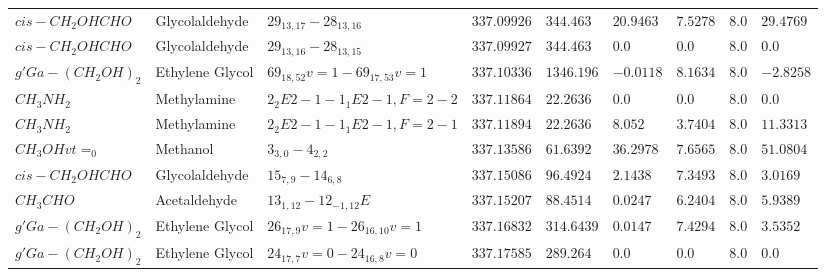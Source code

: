 \documentclass{aa}
\begin{document}
\begin{table}
\begin{tabular}{l l l l l l l l l}
$cis-CH_{2}OHCHO$ & Glycolaldehyde & $29_{13,17}-28_{13,16}$ & $337.09926$ & $344.463$ & $20.9463$ & $7.5278$ & $8.0$ & $29.4769$\\
$cis-CH_{2}OHCHO$ & Glycolaldehyde & $29_{13,16}-28_{13,15}$ & $337.09927$ & $344.463$ & $0.0$ & $0.0$ & $8.0$ & $0.0$\\
$g'Ga-(CH_{2}OH)_{2}$ & Ethylene Glycol & $69_{18,52}v=1-69_{17,53}v=1$ & $337.10336$ & $1346.196$ & $-0.0118$ & $8.1634$ & $8.0$ & $-2.8258$\\
$CH_{3}NH_{2}$ & Methylamine & $2_{2}E2-1-1_{1}E2-1,F=2-2$ & $337.11864$ & $22.2636$ & $0.0$ & $0.0$ & $8.0$ & $0.0$\\
$CH_{3}NH_{2}$ & Methylamine & $2_{2}E2-1-1_{1}E2-1,F=2-1$ & $337.11894$ & $22.2636$ & $8.052$ & $3.7404$ & $8.0$ & $11.3313$\\
$CH_{3}OHvt=_{0}$ & Methanol & $3_{3,0}-4_{2,2}$ & $337.13586$ & $61.6392$ & $36.2978$ & $7.6565$ & $8.0$ & $51.0804$\\
$cis-CH_{2}OHCHO$ & Glycolaldehyde & $15_{7,9}-14_{6,8}$ & $337.15086$ & $96.4924$ & $2.1438$ & $7.3493$ & $8.0$ & $3.0169$\\
$CH_{3}CHO$ & Acetaldehyde & $13_{1,12}-12_{-1,12}E$ & $337.15207$ & $88.4514$ & $0.0247$ & $6.2404$ & $8.0$ & $5.9389$\\
$g'Ga-(CH_{2}OH)_{2}$ & Ethylene Glycol & $26_{17,9}v=1-26_{16,10}v=1$ & $337.16832$ & $314.6439$ & $0.0147$ & $7.4294$ & $8.0$ & $3.5352$\\
$g'Ga-(CH_{2}OH)_{2}$ & Ethylene Glycol & $24_{17,7}v=0-24_{16,8}v=0$ & $337.17585$ & $289.264$ & $0.0$ & $0.0$ & $8.0$ & $0.0$\\

    \hline                  
    \end{tabular}
\end{table}
\end{document}

